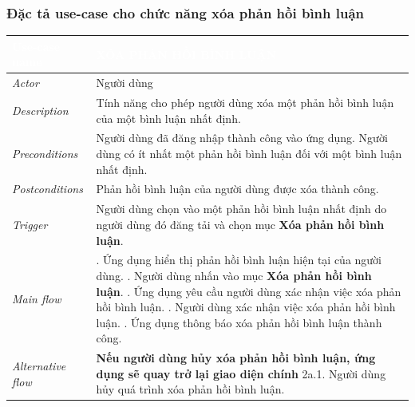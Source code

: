 \subsubsection{Đặc tả use-case cho chức năng xóa phản hồi bình luận}
\begin{center}
    \arrayrulewidth=2pt
    \begin{longtable}{
        |>{\raggedright\arraybackslash}p{3cm}
        |>{\raggedright\arraybackslash}p{13cm}
        |}
        \hline
        \rowcolor{cyan!75!black} \textcolor{white}{\textbf{Use-case name}} & \textcolor{white}{\textbf{XÓA PHẢN HỒI BÌNH LUẬN}}
        \\\hline
        \rowcolor{cyan!10!white} \textit{Actor} & Người dùng
        \\\hdashline
        \rowcolor{cyan!10!white} \textit{Description} & Tính năng cho phép người dùng xóa một phản hồi bình luận của một bình luận nhất định.
        \\\hdashline
        \rowcolor{cyan!10!white} \textit{Preconditions} & Người dùng đã đăng nhập thành công vào ứng dụng. Người dùng có ít nhất một phản hồi bình luận đối với một bình luận nhất định.
        \\\hdashline
        \rowcolor{cyan!10!white} \textit{Postconditions} & Phản hồi bình luận của người dùng được xóa thành công.
        \\\hdashline
        \rowcolor{cyan!10!white} \textit{Trigger} & Người dùng chọn vào một phản hồi bình luận nhất định do người dùng đó đăng tải và chọn mục \textbf{Xóa phản hồi bình luận}.
        \\\hdashline
        \rowcolor{cyan!10!white} \textit{Main flow} &
        1. Ứng dụng hiển thị phản hồi bình luận hiện tại của người dùng. \newline
        3. Người dùng nhấn vào mục \textbf{Xóa phản hồi bình luận}. \newline
        4. Ứng dụng yêu cầu người dùng xác nhận việc xóa phản hồi bình luận. \newline
        5. Người dùng xác nhận việc xóa phản hồi bình luận. \newline
        6. Ứng dụng thông báo xóa phản hồi bình luận thành công.
        \\\hdashline
        \rowcolor{cyan!10!white} \textit{Alternative flow} & 
        \textbf{Nếu người dùng hủy xóa phản hồi bình luận, ứng dụng sẽ quay trở lại giao diện chính} \newline
        2a.1. Người dùng hủy quá trình xóa phản hồi bình luận. \newline

\end{longtable}
\end{center}

